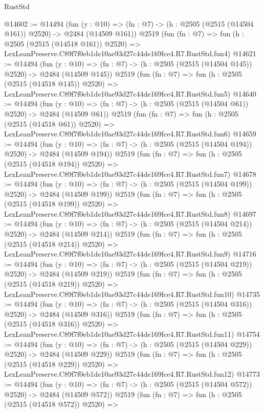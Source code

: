 \begin{lexlean}{RustStd}
\begin{coremodule}
@14602 := @14494
    (fun (y : @10) => (fn : @7) -> (h : @2505 (@2515 (@14504 @161)) @2520) -> @2484 (@14509 @161))
    @2519
    (fun (fn : @7) =>
    fun (h : @2505 (@2515 (@14518 @161)) @2520) =>
    LexLeanPreserve.C89f7f0eb1de10ae93d27c44de169fce4.R7.RustStd.fun4)
@14621 := @14494
    (fun (y : @10) => (fn : @7) -> (h : @2505 (@2515 (@14504 @145)) @2520) -> @2484 (@14509 @145))
    @2519
    (fun (fn : @7) =>
    fun (h : @2505 (@2515 (@14518 @145)) @2520) =>
    LexLeanPreserve.C89f7f0eb1de10ae93d27c44de169fce4.R7.RustStd.fun5)
@14640 := @14494
    (fun (y : @10) => (fn : @7) -> (h : @2505 (@2515 (@14504 @61)) @2520) -> @2484 (@14509 @61))
    @2519
    (fun (fn : @7) =>
    fun (h : @2505 (@2515 (@14518 @61)) @2520) =>
    LexLeanPreserve.C89f7f0eb1de10ae93d27c44de169fce4.R7.RustStd.fun6)
@14659 := @14494
    (fun (y : @10) => (fn : @7) -> (h : @2505 (@2515 (@14504 @194)) @2520) -> @2484 (@14509 @194))
    @2519
    (fun (fn : @7) =>
    fun (h : @2505 (@2515 (@14518 @194)) @2520) =>
    LexLeanPreserve.C89f7f0eb1de10ae93d27c44de169fce4.R7.RustStd.fun7)
@14678 := @14494
    (fun (y : @10) => (fn : @7) -> (h : @2505 (@2515 (@14504 @199)) @2520) -> @2484 (@14509 @199))
    @2519
    (fun (fn : @7) =>
    fun (h : @2505 (@2515 (@14518 @199)) @2520) =>
    LexLeanPreserve.C89f7f0eb1de10ae93d27c44de169fce4.R7.RustStd.fun8)
@14697 := @14494
    (fun (y : @10) => (fn : @7) -> (h : @2505 (@2515 (@14504 @214)) @2520) -> @2484 (@14509 @214))
    @2519
    (fun (fn : @7) =>
    fun (h : @2505 (@2515 (@14518 @214)) @2520) =>
    LexLeanPreserve.C89f7f0eb1de10ae93d27c44de169fce4.R7.RustStd.fun9)
@14716 := @14494
    (fun (y : @10) => (fn : @7) -> (h : @2505 (@2515 (@14504 @219)) @2520) -> @2484 (@14509 @219))
    @2519
    (fun (fn : @7) =>
    fun (h : @2505 (@2515 (@14518 @219)) @2520) =>
    LexLeanPreserve.C89f7f0eb1de10ae93d27c44de169fce4.R7.RustStd.fun10)
@14735 := @14494
    (fun (y : @10) => (fn : @7) -> (h : @2505 (@2515 (@14504 @316)) @2520) -> @2484 (@14509 @316))
    @2519
    (fun (fn : @7) =>
    fun (h : @2505 (@2515 (@14518 @316)) @2520) =>
    LexLeanPreserve.C89f7f0eb1de10ae93d27c44de169fce4.R7.RustStd.fun11)
@14754 := @14494
    (fun (y : @10) => (fn : @7) -> (h : @2505 (@2515 (@14504 @229)) @2520) -> @2484 (@14509 @229))
    @2519
    (fun (fn : @7) =>
    fun (h : @2505 (@2515 (@14518 @229)) @2520) =>
    LexLeanPreserve.C89f7f0eb1de10ae93d27c44de169fce4.R7.RustStd.fun12)
@14773 := @14494
    (fun (y : @10) => (fn : @7) -> (h : @2505 (@2515 (@14504 @572)) @2520) -> @2484 (@14509 @572))
    @2519
    (fun (fn : @7) =>
    fun (h : @2505 (@2515 (@14518 @572)) @2520) =>

\end{coremodule}
\end{lexlean}
